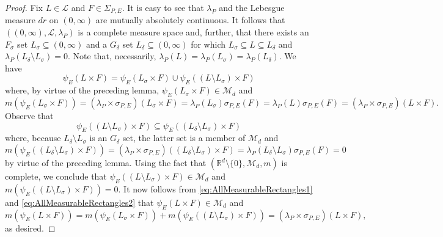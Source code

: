 \documentclass[11pt, letter]{book}
\begin{document}
\begin{proof}
Fix $L\in\mathcal{L}$ and $F\in\Sigma_{P,E}$. It is easy to see that $\lambda_P$ and the Lebesgue measure $dr$ on $(0,\infty)$ are mutually absolutely continuous. It follows that $((0,\infty), \mathcal{L},\lambda_P)$ is a complete measure space and, further, that there exists an $F_\sigma$ set $L_\sigma\subseteq (0,\infty)$ and a $G_\delta$ set $L_\delta\subseteq (0,\infty)$ for which $L_\sigma\subseteq L\subseteq L_\delta$ and $\lambda_P(L_\delta\setminus L_\sigma)=0$. Note that, necessarily, $\lambda_P(L)=\lambda_P(L_\sigma)=\lambda_P(L_\delta)$. We have
\begin{equation}\label{eq:AllMeasurableRectangles1}
\psi_E(L\times F)=\psi_E( L_\sigma\times F)\cup\psi_E((L\setminus L_\sigma)\times F)
\end{equation}
where, by virtue of the preceding lemma, $\psi_E(L_\sigma\times F)\in \mathcal{M}_d$ and
\begin{equation}\label{eq:AllMeasurableRectangles2}
m(\psi_E(L_{\sigma}\times F))=(\lambda_P\times\sigma_{P,E})( L_\sigma\times F)=\lambda_P(L_\sigma)\sigma_{P,E}(F)=\lambda_P(L)\sigma_{P,E}(F)=(\lambda_P\times\sigma_{P,E})(L\times F).
\end{equation}
Observe that
\begin{equation*}
\psi_E((L\setminus L_\sigma)\times F)\subseteq \psi_E((L_{\delta}\setminus L_\sigma)\times F)
\end{equation*}
where, because $L_\delta\setminus L_\sigma$ is an $G_{\delta}$ set, the latter set is a member of $\mathcal{M}_d$ and
\begin{equation*}
m(\psi_E((L_\delta\setminus L_\sigma)\times F))=(\lambda_P\times\sigma_{P,E})((L_\delta\setminus L_\sigma)\times F)=\lambda_P(L_\delta\setminus L_\sigma)\sigma_{P,E}(F)=0
\end{equation*}
by virtue of the preceding lemma. Using the fact that $(\mathbb{R}^d\setminus\{0\},\mathcal{M}_d,m)$ is complete, we conclude that $\psi_E((L\setminus L_\sigma)\times F)\in \mathcal{M}_d$ and $m(\psi_E((L\setminus L_\sigma)\times F))=0$. It now follows from \eqref{eq:AllMeasurableRectangles1} and \eqref{eq:AllMeasurableRectangles2} that $\psi_E(L\times F)\in\mathcal{M}_d$ and
\begin{equation*}
m(\psi_E(L\times F))=m(\psi_E(L_\sigma\times F))+m(\psi_E((L\setminus L_\sigma)\times F))=(\lambda_P\times\sigma_{P,E})(L\times F),
\end{equation*}
as desired.
\end{proof}
\end{document}
